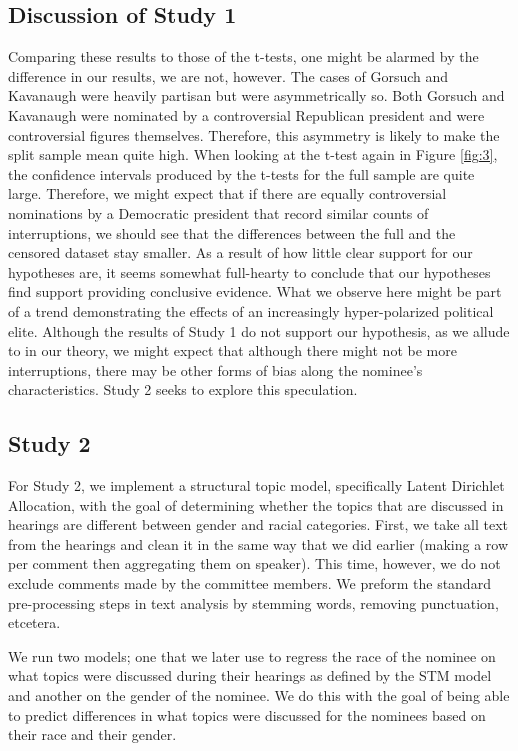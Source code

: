 \documentclass [12pt]{article}
\begin{document}
\subsection{Discussion of Study 1}
	    
Comparing these results to those of the t-tests, one might be alarmed by the difference in our results, we are not, however. The cases of Gorsuch and Kavanaugh were heavily partisan but were asymmetrically so. Both Gorsuch and Kavanaugh were nominated by a controversial Republican president and were controversial figures themselves. Therefore, this asymmetry is likely to make the split sample mean quite high. When looking at the t-test again in Figure \ref{fig:3}, the confidence intervals produced by the t-tests for the full sample are quite large. Therefore, we might expect that if there are equally controversial nominations by a Democratic president that record similar counts of interruptions, we should see that the differences between the full and the censored dataset stay smaller. As a result of how little clear support for our hypotheses are, it seems somewhat full-hearty to conclude that our hypotheses find support providing conclusive evidence. What we observe here might be part of a trend demonstrating the effects of an increasingly hyper-polarized political elite. Although the results of Study 1 do not support our hypothesis, as we allude to in our theory, we might expect that although there might not be more interruptions, there may be other forms of bias along the nominee's characteristics. Study 2 seeks to explore this speculation.
	    
\subsection{Study 2}
For Study 2, we implement a structural topic model, specifically Latent Dirichlet Allocation, with the goal of determining whether the topics that are discussed in hearings are different between gender and racial categories. First, we take all text from the hearings and clean it in the same way that we did earlier (making a row per comment then aggregating them on speaker). This time, however, we do not exclude comments made by the committee members. We preform the standard pre-processing steps in text analysis by stemming words, removing punctuation, etcetera. 
	    
We run two models; one that we later use to regress the race of the nominee on what topics were discussed during their hearings as defined by the STM model and another on the gender of the nominee. We do this with the goal of being able to predict differences in what topics were discussed for the nominees based on their race and their gender. 
\end{document}
